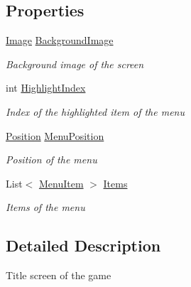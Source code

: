 \subsection*{Properties}
\begin{DoxyCompactItemize}
\item 
\hyperlink{class_hel_project_1_1_u_i_1_1_image}{Image} \hyperlink{class_hel_project_1_1_u_i_1_1_menu_1_1_menu_screen_a3f4d85faa700315baaa4a5f40bf3576e}{Background\+Image}
\begin{DoxyCompactList}\small\item\em Background image of the screen \end{DoxyCompactList}\item 
int \hyperlink{class_hel_project_1_1_u_i_1_1_menu_1_1_menu_screen_ad673eedc194957e3e8ecd157bf954f9c}{Highlight\+Index}
\begin{DoxyCompactList}\small\item\em Index of the highlighted item of the menu \end{DoxyCompactList}\item 
\hyperlink{class_hel_project_1_1_tools_1_1_position}{Position} \hyperlink{class_hel_project_1_1_u_i_1_1_menu_1_1_menu_screen_a112ebabb44410ac6eee8a5b73ce59793}{Menu\+Position}
\begin{DoxyCompactList}\small\item\em Position of the menu \end{DoxyCompactList}\item 
List$<$ \hyperlink{class_hel_project_1_1_u_i_1_1_menu_1_1_menu_item}{Menu\+Item} $>$ \hyperlink{class_hel_project_1_1_u_i_1_1_menu_1_1_menu_screen_a5c4e68d9b5187dde747e872b719d2886}{Items}
\begin{DoxyCompactList}\small\item\em Items of the menu \end{DoxyCompactList}\end{DoxyCompactItemize}


\subsection{Detailed Description}
Title screen of the game 



